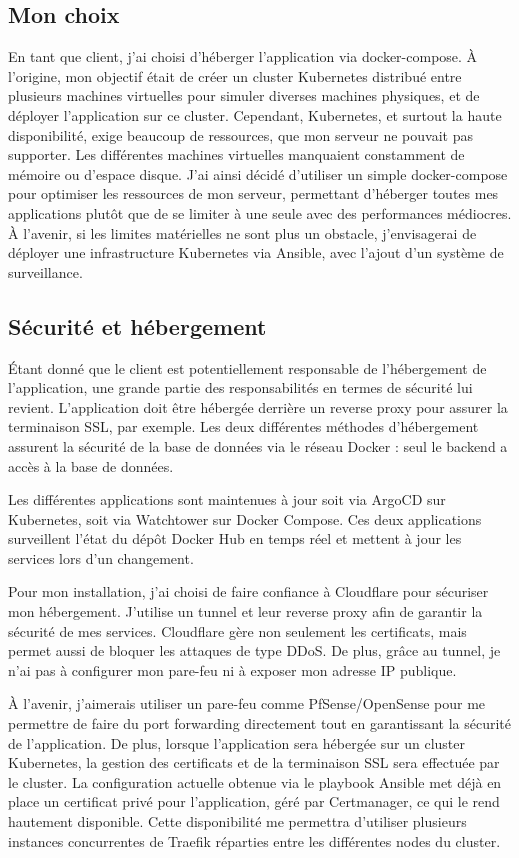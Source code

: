 \subsection{Mon choix}\label{subsec:mon-choix}
En tant que client, j'ai choisi d'héberger l'application via docker-compose.
À l'origine, mon objectif était de créer un cluster Kubernetes distribué entre plusieurs machines virtuelles pour simuler diverses machines physiques, et de déployer l'application sur ce cluster.
Cependant, Kubernetes, et surtout la haute disponibilité, exige beaucoup de ressources, que mon serveur ne pouvait pas supporter.
Les différentes machines virtuelles manquaient constamment de mémoire ou d'espace disque.
J'ai ainsi décidé d'utiliser un simple docker-compose pour optimiser les ressources de mon serveur, permettant d'héberger toutes mes applications plutôt que de se limiter à une seule avec des performances médiocres.
À l'avenir, si les limites matérielles ne sont plus un obstacle, j'envisagerai de déployer une infrastructure Kubernetes via Ansible, avec l'ajout d'un système de surveillance.

\subsection{Sécurité et hébergement}\label{subsec:securite-et-hebergement}
Étant donné que le client est potentiellement responsable de l'hébergement de l'application, une grande partie des responsabilités en termes de sécurité lui revient.
L'application doit être hébergée derrière un reverse proxy pour assurer la terminaison SSL, par exemple.
Les deux différentes méthodes d'hébergement assurent la sécurité de la base de données via le réseau Docker : seul le backend a accès à la base de données.

Les différentes applications sont maintenues à jour soit via ArgoCD sur Kubernetes, soit via Watchtower sur Docker Compose.
Ces deux applications surveillent l'état du dépôt Docker Hub en temps réel et mettent à jour les services lors d'un changement.

Pour mon installation, j'ai choisi de faire confiance à Cloudflare pour sécuriser mon hébergement.
J'utilise un tunnel et leur reverse proxy afin de garantir la sécurité de mes services.
Cloudflare gère non seulement les certificats, mais permet aussi de bloquer les attaques de type DDoS. De plus, grâce au tunnel, je n'ai pas à configurer mon pare-feu ni à exposer mon adresse IP publique.

À l'avenir, j'aimerais utiliser un pare-feu comme PfSense/OpenSense pour me permettre de faire du port forwarding directement tout en garantissant la sécurité de l'application.
De plus, lorsque l'application sera hébergée sur un cluster Kubernetes, la gestion des certificats et de la terminaison SSL sera effectuée par le cluster.
La configuration actuelle obtenue via le playbook Ansible met déjà en place un certificat privé pour l'application, géré par Certmanager, ce qui le rend hautement disponible.
Cette disponibilité me permettra d'utiliser plusieurs instances concurrentes de Traefik réparties entre les différentes nodes du cluster.
